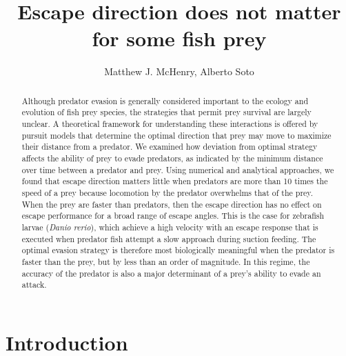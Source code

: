 \documentclass[12pt]{article}
\title{Escape direction does not matter for some fish prey}
\author{Matthew J. McHenry, Alberto Soto}
\begin{document}

\maketitle

\pagebreak


\begin{abstract}

Although predator evasion is generally considered important to the ecology and evolution of fish prey species, the strategies that permit prey survival are largely unclear. A theoretical framework for understanding these interactions is offered by pursuit models that determine the optimal direction that prey may move to maximize their distance from a predator. We examined how deviation from optimal strategy affects the ability of prey to evade predators, as indicated by the minimum distance over time between a predator and prey. Using numerical and analytical approaches, we found that escape direction matters little when predators are more than 10 times the speed of a prey because locomotion by the predator overwhelms that of the prey. When the prey are faster than predators, then the escape direction has no effect on escape performance for a broad range of escape angles. This is the case for zebrafish larvae (\textit{Danio rerio}), which achieve a high velocity with an escape response that is executed when predator fish attempt a slow approach during suction feeding. The optimal evasion strategy is therefore most biologically meaningful when the predator is faster than the prey, but by less than an order of magnitude. In this regime, the accuracy of the predator is also a major determinant of a prey's ability to evade an attack.

\end{abstract}

\pagebreak


\section{Introduction}
\label{intro}
\end{document}
